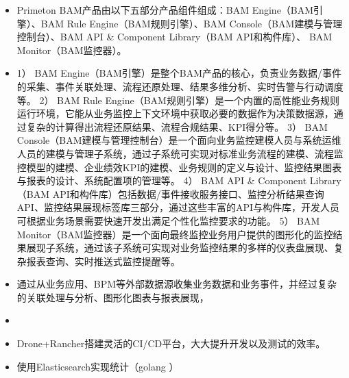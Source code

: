 \documentclass{resume}
\begin{document}
{\begin{itemize}
  2.	流程绩效监控：
  企业首先梳理多层级的标准流程，并基于BPM平台或业务系统进行流程实现，然后通过从BPM平台或者业务系统实时地捕获流程执行状态数据和业务相关数据，实现从全流程视角对“流程执行绩效指标”和“流程关联的业务指标”进行监控，促进绩效改进。
  
  3.	流程合规监控：
  从BPM或者业务系统实时地捕获流程执行过程和业务相关数据，进行流程还原并与标准流程进行对照，对“流程执行过程的合规性”（包括两类监控内容：①基础违规监控，比如步骤缺失/多余、次序错乱、岗位错误等；②业务关联违规，比如多级审批违规、操作规则违规、指标超限违规等）进行监控，使企业能够尽早识别流程执行中存在的风险，并采取相对应的风险应对措施。
  

  \item Primeton BAM产品由以下五部分产品组件组成：BAM Engine（BAM引擎）、BAM Rule Engine（BAM规则引擎）、BAM Console（BAM建模与管理控制台）、BAM API & Component Library（BAM API和构件库）、 BAM Monitor（BAM监控器）。
  \item 1）	BAM Engine（BAM引擎）是整个BAM产品的核心，负责业务数据/事件的采集、事件关联处理、流程还原处理、结果多维分析、实时告警与行动调度等。 
  2）	BAM Rule Engine（BAM规则引擎）是一个内置的高性能业务规则运行环境，它能从业务监控上下文环境中获取必要的数据作为决策数据源，通过复杂的计算得出流程还原结果、流程合规结果、KPI得分等。 
  3）	BAM Console（BAM建模与管理控制台）是一个面向业务监控建模人员与系统运维人员的建模与管理子系统，通过子系统可实现对标准业务流程的建模、流程监控模型的建模、企业绩效KPI的建模、业务规则的定义与设计、监控结果图表与报表的设计、系统配置项的管理等。 
  4）	BAM API & Component Library（BAM API和构件库）包括数据/事件接收服务接口、监控分析结果查询API、监控结果展现标签库三部分，通过这些丰富的API与构件库，开发人员可根据业务场景需要快速开发出满足个性化监控要求的功能。 
  5）	BAM Monitor（BAM监控器）是一个面向最终监控业务用户提供的图形化的监控结果展现子系统，通过该子系统可实现对业务监控结果的多样的仪表盘展现、复杂报表查询、实时推送式监控提醒等。
  
  
\end{itemize}



\vspace{0.5ex}
\begin{itemize}
  \item 通过从业务应用、BPM等外部数据源收集业务数据和业务事件，并经过复杂的关联处理与分析、图形化图表与报表展现，
  \item 
  \item Drone+Rancher搭建灵活的CI/CD平台，大大提升开发以及测试的效率。
  \item 使用Elasticsearch实现统计（golang ）
\end{itemize}



}
\end{document}
